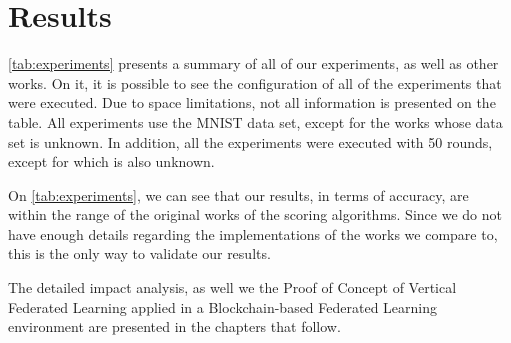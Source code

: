 \section{Results}

\autoref{tab:experiments} presents a summary of all of our experiments, as well as other works. On it, it is possible to see the configuration of all of the experiments that were executed. Due to space limitations, not all information is presented on the table. All experiments use the MNIST data set, except for the works \cite{10.48550/arxiv.2007.03856, 10.48550/arxiv.2011.07516} whose data set is unknown. In addition, all the experiments were executed with 50 rounds, except for \cite{9170559} which is also unknown.

On \autoref{tab:experiments}, we can see that our results, in terms of accuracy, are within the range of the original works of the scoring algorithms. Since we do not have enough details regarding the implementations of the works we compare to, this is the only way to validate our results.

The detailed impact analysis, as well we the Proof of Concept of Vertical Federated Learning applied in a Blockchain-based Federated Learning environment are presented in the chapters that follow.

